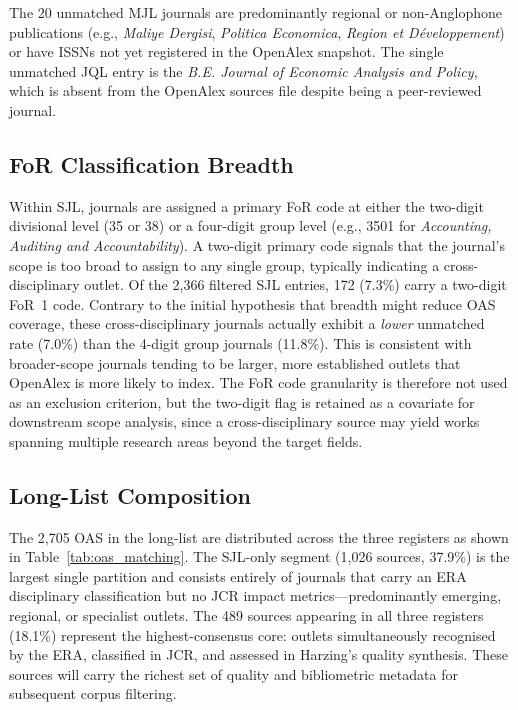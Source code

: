 \documentclass[10pt]{article}
\begin{document}
The 20 unmatched MJL journals are predominantly regional or non-Anglophone publications
(e.g., \textit{Maliye Dergisi}, \textit{Politica Economica}, \textit{Region et
	D\'eveloppement}) or have ISSNs not yet registered in the OpenAlex snapshot.
The single unmatched JQL entry is the
\textit{B.E. Journal of Economic Analysis and Policy}, which is absent from the
OpenAlex sources file despite being a peer-reviewed journal.

\subsection{FoR Classification Breadth}

Within SJL, journals are assigned a primary FoR code at either the two-digit
divisional level (35 or 38) or a four-digit group level (e.g., 3501 for
\textit{Accounting, Auditing and Accountability}).
A two-digit primary code signals that the journal's scope is too broad to assign
to any single group, typically indicating a cross-disciplinary outlet.
Of the 2{,}366 filtered SJL entries, 172 (7.3\%) carry a two-digit FoR~1 code.
Contrary to the initial hypothesis that breadth might reduce OAS coverage,
these cross-disciplinary journals actually exhibit a \textit{lower} unmatched rate
(7.0\%) than the 4-digit group journals (11.8\%).
This is consistent with broader-scope journals tending to be larger, more established
outlets that OpenAlex is more likely to index.
The FoR code granularity is therefore not used as an exclusion criterion,
but the two-digit flag is retained as a covariate for downstream scope analysis,
since a cross-disciplinary source may yield works spanning multiple research areas
beyond the target fields.

\subsection{Long-List Composition}

The 2{,}705 OAS in the long-list are distributed across the three registers as shown
in Table~\ref{tab:oas_matching}.
The SJL-only segment (1{,}026 sources, 37.9\%) is the largest single partition and
consists entirely of journals that carry an ERA disciplinary classification but
no JCR impact metrics---predominantly emerging, regional, or specialist outlets.
The 489 sources appearing in all three registers (18.1\%) represent the
highest-consensus core: outlets simultaneously recognised by the ERA,
classified in JCR, and assessed in Harzing's quality synthesis.
These sources will carry the richest set of quality and bibliometric metadata for
subsequent corpus filtering.
\end{document}
